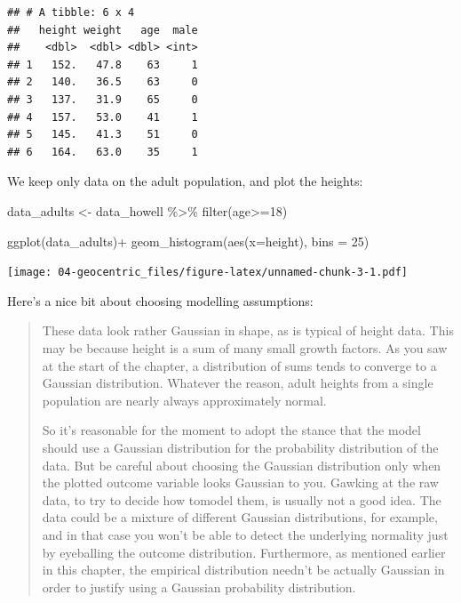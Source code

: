 \documentclass[
]{book}
\newenvironment{Shaded}{\begin{snugshade}}{\end{snugshade}}
\newcommand{\AttributeTok}[1]{\textcolor[rgb]{0.77,0.63,0.00}{#1}}
\newcommand{\DecValTok}[1]{\textcolor[rgb]{0.00,0.00,0.81}{#1}}
\newcommand{\FunctionTok}[1]{\textcolor[rgb]{0.00,0.00,0.00}{#1}}
\newcommand{\NormalTok}[1]{#1}
\newcommand{\OtherTok}[1]{\textcolor[rgb]{0.56,0.35,0.01}{#1}}
\newcommand{\SpecialCharTok}[1]{\textcolor[rgb]{0.00,0.00,0.00}{#1}}
\begin{document}
\begin{verbatim}
## # A tibble: 6 x 4
##   height weight   age  male
##    <dbl>  <dbl> <dbl> <int>
## 1   152.   47.8    63     1
## 2   140.   36.5    63     0
## 3   137.   31.9    65     0
## 4   157.   53.0    41     1
## 5   145.   41.3    51     0
## 6   164.   63.0    35     1
\end{verbatim}

We keep only data on the adult population, and plot the heights:

\begin{Shaded}
\begin{Highlighting}[]
\NormalTok{data\_adults }\OtherTok{\textless{}{-}}\NormalTok{ data\_howell }\SpecialCharTok{\%\textgreater{}\%}
  \FunctionTok{filter}\NormalTok{(age}\SpecialCharTok{\textgreater{}=}\DecValTok{18}\NormalTok{)}

\FunctionTok{ggplot}\NormalTok{(data\_adults)}\SpecialCharTok{+}
  \FunctionTok{geom\_histogram}\NormalTok{(}\FunctionTok{aes}\NormalTok{(}\AttributeTok{x=}\NormalTok{height), }\AttributeTok{bins =} \DecValTok{25}\NormalTok{)}
\end{Highlighting}
\end{Shaded}

\texttt{[image: 04-geocentric\_files/figure-latex/unnamed-chunk-3-1.pdf]}

Here's a nice bit about choosing modelling assumptions:

\begin{quote}
These data look rather Gaussian in shape, as is typical of height data. This may be because height is a sum of many
small growth factors. As you saw at the start of the chapter, a distribution of sums tends to converge to a Gaussian distribution. Whatever the reason, adult heights from a single population are nearly always approximately normal.

So it's reasonable for the moment to adopt the stance that the model should use a Gaussian distribution for the probability distribution of the data. But be careful about choosing the Gaussian distribution only when the plotted outcome variable looks Gaussian to you. Gawking at the raw data, to try to decide how tomodel them, is usually not a good idea. The data could be a mixture of different Gaussian distributions, for example, and in that case you won't be able to detect the underlying normality just by eyeballing the outcome distribution. Furthermore, as mentioned earlier in this chapter, the empirical distribution needn't be actually Gaussian in order to justify using a Gaussian probability distribution.
\end{quote}
\end{document}
